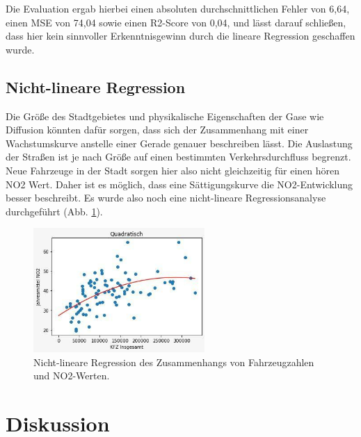 \documentclass[11pt,a4paper,oneside,german]{article}
\begin{document}
	Die Evaluation ergab hierbei einen absoluten durchschnittlichen Fehler von 6,64, einen MSE von 74,04 sowie einen R2-Score von 0,04, und lässt darauf schließen, dass hier kein sinnvoller Erkenntnisgewinn durch die lineare Regression geschaffen wurde.
	
	\subsection{Nicht-lineare Regression}
	
	Die Größe des Stadtgebietes und physikalische Eigenschaften der Gase wie Diffusion könnten dafür sorgen, dass sich der Zusammenhang mit einer Wachstumskurve anstelle einer Gerade genauer beschreiben lässt. Die Auslastung der Straßen ist je nach Größe auf einen bestimmten Verkehrsdurchfluss begrenzt. Neue Fahrzeuge in der Stadt sorgen hier also nicht gleichzeitig für einen hören NO2 Wert. Daher ist es möglich, dass eine Sättigungskurve die NO2-Entwicklung besser beschreibt. Es wurde also noch eine nicht-lineare Regressionsanalyse durchgeführt (Abb. \ref{fig:nonlinreg}).
	
	\begin{figure}[H]
	\centering
	\includegraphics[width=6.5cm]{nonlinreg.jpg}
	\caption{Nicht-lineare Regression des Zusammenhangs von Fahrzeugzahlen und NO2-Werten.}
	\label{fig:nonlinreg}
	\end{figure}
	
	\section{Diskussion}
	
\end{document}
